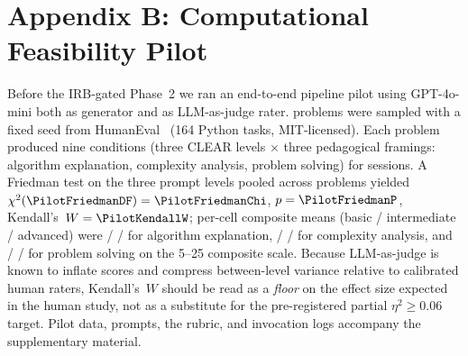 
\section*{Appendix B: Computational Feasibility Pilot}\label{sec:appendix-b}

Before the IRB-gated Phase~2 we ran an end-to-end pipeline pilot using
GPT-4o-mini both as generator and as LLM-as-judge rater. \PilotN{} problems
were sampled with a fixed seed from HumanEval~\cite{Chen2021HumanEval}
(164 Python tasks, MIT-licensed). Each problem produced nine conditions
(three CLEAR levels $\times$ three pedagogical framings: algorithm
explanation, complexity analysis, problem solving) for \PilotSessions{}
sessions. A Friedman test on the three prompt levels pooled across
problems yielded $\chi^2(\PilotFriedmanDF)=\PilotFriedmanChi$,
$p=\PilotFriedmanP$, Kendall's~$W=\PilotKendallW$; per-cell composite
means (basic / intermediate / advanced) were \PilotAlgoBasic{} /
\PilotAlgoInt{} / \PilotAlgoAdv{} for algorithm explanation,
\PilotCxBasic{} / \PilotCxInt{} / \PilotCxAdv{} for complexity analysis,
and \PilotPsBasic{} / \PilotPsInt{} / \PilotPsAdv{} for problem solving
on the 5--25 composite scale. Because LLM-as-judge is known to inflate
scores and compress between-level variance relative to calibrated human
raters, Kendall's~$W$ should be read as a \emph{floor} on the effect
size expected in the human study, not as a substitute for the
pre-registered partial $\eta^2\geq0.06$ target. Pilot data, prompts, the
rubric, and invocation logs accompany the supplementary material.
